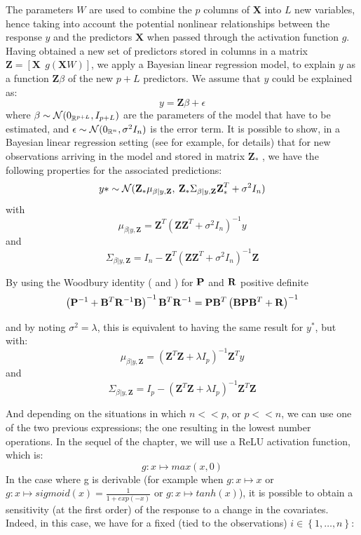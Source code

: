 The parameters $W$ are used to combine the $p$ columns of \textbf{X} into $L$ new variables, hence taking into account the potential nonlinear relationships between the response $y$ and the predictors $\textbf{X}$ when passed through the activation function $g$. Having obtained a new set of predictors stored in columns in a matrix $\textbf{Z} = \left[ \textbf{X} \:\:  g \left(\textbf{X}W\right)\right]$, we apply a Bayesian linear regression model, to explain $y$ as a function $\textbf{Z} \beta$ of the new $p + L$ predictors. We assume that $y$ could be explained as: 
$$
y = \textbf{Z} \beta + \epsilon
$$
where $\beta \sim \mathcal{N}(0_{\mathbb{R}^{p + L}}, I_{p + L})$ are the parameters of the model that have to be estimated,  and $\epsilon \sim \mathcal{N}(0_{\mathbb{R}^n}, \sigma^2 I_n)$ is the error term. It is possible to show, in a Bayesian linear regression setting (see \cite{rasmussen2006gaussian} for example, for details) that for new observations arriving in the model and stored in matrix $\textbf{Z}_*$ , we have the following properties for the associated predictions: 
$$
y* \sim  \mathcal{N}(\textbf{Z}_* \mu_{\beta | y, \textbf{Z}}, \: \textbf{Z}_* \Sigma_{\beta | y, \textbf{Z}} \textbf{Z}_*^T + \sigma^2 I_n)
$$
with 
$$
\mu_{\beta | y, \textbf{Z}} = \textbf{Z}^T \left( \textbf{Z} \textbf{Z}^T + \sigma^2 I_n\right)^{-1}y
$$
and 
$$
\Sigma_{\beta | y, \textbf{Z}} = I_n - \textbf{Z}^T \left( \textbf{Z} \textbf{Z}^T + \sigma^2 I_n\right)^{-1}\textbf{Z}
$$

\medskip

By using the Woodbury identity (\cite{golub2012matrix} and \cite{welling2010kalman}) for ${\bf P}$ and ${\bf R}$ positive definite
$$
\left({\bf P}^{-1} + {\bf B}^T {\bf R}^{-1} {\bf B} \right)^{-1}{\bf B}^T {\bf R}^{-1} =
{\bf P}{\bf B}^T \left( {\bf B} {\bf P} {\bf B}^T + {\bf R}\right)^{-1}
$$

and by noting $\sigma^2 = \lambda$, this is equivalent to having the same result for $y^*$, but with: 
$$
\mu_{\beta | y, \textbf{Z}} =  \left( \textbf{Z}^T\textbf{Z} + \lambda I_p\right)^{-1}\textbf{Z}^Ty
$$
and 
$$
\Sigma_{\beta | y, \textbf{Z}} = I_p -  \left( \textbf{Z}^T\textbf{Z} + \lambda I_p\right)^{-1}\textbf{Z}^T\textbf{Z}
$$

And depending on the situations in which $n << p$, or $p << n$, we can use one of the two previous expressions; the one resulting in the lowest number operations. In the sequel of the chapter, we will use a ReLU activation function, which is:
$$
g: x \mapsto max(x, 0)
$$ 
In the case where g is derivable (for example when 
$
g: x \mapsto x
$ or 
$
g: x \mapsto sigmoid(x) = \frac{1}{1 + exp(-x)}
$
or 
$
g: x \mapsto tanh(x)
$), it is possible to obtain a sensitivity (at the first order) of the response to a change in the covariates. Indeed, in this case, we have for a fixed (tied to the observations) $i \in \left \lbrace 1, \ldots, n \right \rbrace $: 

